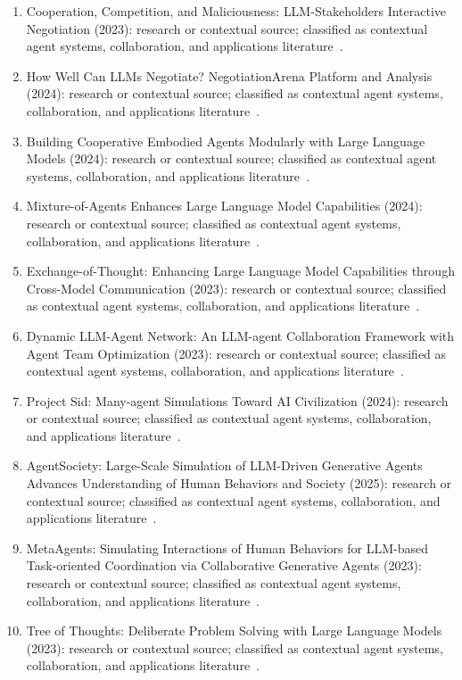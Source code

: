 \begin{enumerate}
\item Cooperation, Competition, and Maliciousness: {LLM}-Stakeholders Interactive Negotiation (2023): research or contextual source; classified as contextual agent systems, collaboration, and applications literature~\cite{ext082}.
\item How Well Can {LLM}s Negotiate? {NegotiationArena} Platform and Analysis (2024): research or contextual source; classified as contextual agent systems, collaboration, and applications literature~\cite{ext083}.
\item Building Cooperative Embodied Agents Modularly with Large Language Models (2024): research or contextual source; classified as contextual agent systems, collaboration, and applications literature~\cite{ext084}.
\item Mixture-of-Agents Enhances Large Language Model Capabilities (2024): research or contextual source; classified as contextual agent systems, collaboration, and applications literature~\cite{ext085}.
\item Exchange-of-Thought: Enhancing Large Language Model Capabilities through Cross-Model Communication (2023): research or contextual source; classified as contextual agent systems, collaboration, and applications literature~\cite{ext086}.
\item Dynamic {LLM}-Agent Network: An {LLM}-agent Collaboration Framework with Agent Team Optimization (2023): research or contextual source; classified as contextual agent systems, collaboration, and applications literature~\cite{ext087}.
\item Project Sid: Many-agent Simulations Toward {AI} Civilization (2024): research or contextual source; classified as contextual agent systems, collaboration, and applications literature~\cite{ext088}.
\item {AgentSociety}: Large-Scale Simulation of {LLM}-Driven Generative Agents Advances Understanding of Human Behaviors and Society (2025): research or contextual source; classified as contextual agent systems, collaboration, and applications literature~\cite{ext089}.
\item {MetaAgents}: Simulating Interactions of Human Behaviors for {LLM}-based Task-oriented Coordination via Collaborative Generative Agents (2023): research or contextual source; classified as contextual agent systems, collaboration, and applications literature~\cite{ext091}.
\item Tree of Thoughts: Deliberate Problem Solving with Large Language Models (2023): research or contextual source; classified as contextual agent systems, collaboration, and applications literature~\cite{ext092}.

\end{enumerate}
